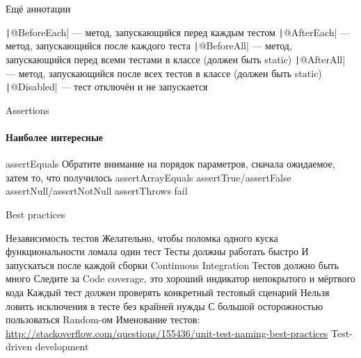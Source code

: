 \documentclass{../../slides-style}
\begin{document}

    \begin{frame}{Ещё аннотации}
        \begin{outline}
            \1 \texttt|@BeforeEach| --- метод, запускающийся перед каждым тестом
            \1 \texttt|@AfterEach| --- метод, запускающийся после каждого теста
            \1 \texttt|@BeforeAll| --- метод, запускающийся перед всеми тестами в классе (должен быть static)
            \1 \texttt|@AfterAll| --- метод, запускающийся после всех тестов в классе (должен быть static)
            \1 \texttt|@Disabled| --- тест отключён и не запускается
        \end{outline}
    \end{frame}

    \begin{frame}{Assertions}
        \framesubtitle{Наиболее интересные}
        \begin{outline}
            \1 assertEquals
                \2 Обратите внимание на порядок параметров, сначала ожидаемое, затем то, что получилось
            \1 assertArrayEquals
            \1 assertTrue/assertFalse
            \1 assertNull/assertNotNull
            \1 assertThrows
            \1 fail
        \end{outline}
    \end{frame}

    \begin{frame}{Best practices}
        \begin{outline}
            \1 Независимость тестов
                \2 Желательно, чтобы поломка одного куска функциональности ломала один тест
            \1 Тесты должны работать быстро
                \2 И запускаться после каждой сборки
                    \3 Continuous Integration
            \1 Тестов должно быть много
                \2 Следите за Code coverage, это хороший индикатор непокрытого и мёртвого кода
            \1 Каждый тест должен проверять конкретный тестовый сценарий
                \2 Нельзя ловить исключения в тесте без крайней нужды
                \2 С большой осторожностью пользоваться Random-ом
            \1 Именование тестов: \url{http://stackoverflow.com/questions/155436/unit-test-naming-best-practices}
            \1 Test-driven development
        \end{outline}
    \end{frame}
\end{document}
